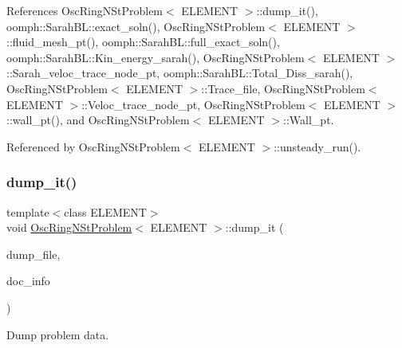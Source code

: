 References Osc\+Ring\+N\+St\+Problem$<$ E\+L\+E\+M\+E\+N\+T $>$\+::dump\+\_\+it(), oomph\+::\+Sarah\+B\+L\+::exact\+\_\+soln(), Osc\+Ring\+N\+St\+Problem$<$ E\+L\+E\+M\+E\+N\+T $>$\+::fluid\+\_\+mesh\+\_\+pt(), oomph\+::\+Sarah\+B\+L\+::full\+\_\+exact\+\_\+soln(), oomph\+::\+Sarah\+B\+L\+::\+Kin\+\_\+energy\+\_\+sarah(), Osc\+Ring\+N\+St\+Problem$<$ E\+L\+E\+M\+E\+N\+T $>$\+::\+Sarah\+\_\+veloc\+\_\+trace\+\_\+node\+\_\+pt, oomph\+::\+Sarah\+B\+L\+::\+Total\+\_\+\+Diss\+\_\+sarah(), Osc\+Ring\+N\+St\+Problem$<$ E\+L\+E\+M\+E\+N\+T $>$\+::\+Trace\+\_\+file, Osc\+Ring\+N\+St\+Problem$<$ E\+L\+E\+M\+E\+N\+T $>$\+::\+Veloc\+\_\+trace\+\_\+node\+\_\+pt, Osc\+Ring\+N\+St\+Problem$<$ E\+L\+E\+M\+E\+N\+T $>$\+::wall\+\_\+pt(), and Osc\+Ring\+N\+St\+Problem$<$ E\+L\+E\+M\+E\+N\+T $>$\+::\+Wall\+\_\+pt.



Referenced by Osc\+Ring\+N\+St\+Problem$<$ E\+L\+E\+M\+E\+N\+T $>$\+::unsteady\+\_\+run().

\mbox{\label{classOscRingNStProblem_af32f94658174188b1f029446161755b2}} 
\subsubsection{\texorpdfstring{dump\+\_\+it()}{dump\_it()}\hspace{0.1cm}{\footnotesize\ttfamily [1/2]}}
{\footnotesize\ttfamily template$<$class E\+L\+E\+M\+E\+NT$>$ \\
void \hyperlink{classOscRingNStProblem}{Osc\+Ring\+N\+St\+Problem}$<$ E\+L\+E\+M\+E\+NT $>$\+::dump\+\_\+it (\begin{DoxyParamCaption}\item[{ofstream \&}]{dump\+\_\+file,  }\item[{Doc\+Info}]{doc\+\_\+info }\end{DoxyParamCaption})}



Dump problem data. 

\mbox{\label{classOscRingNStProblem_af32f94658174188b1f029446161755b2}} 
